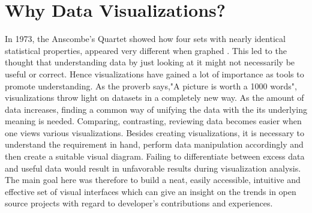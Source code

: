 \documentclass[double,12pt]{beavtex}
\begin{document}
\section{Why Data Visualizations?}
In 1973, the Anscombe's Quartet showed how four sets with nearly identical statistical properties, appeared very different when graphed \cite{wiki}. This led to the thought that understanding data by just looking at it might not necessarily be useful or correct. Hence visualizations have gained a lot of importance as tools to promote understanding. As the proverb says,"A picture is worth a 1000 words", visualizations throw light on datasets in a completely new way. As the amount of data increases, finding a common way of unifying the data with the its underlying meaning is needed. Comparing, contrasting, reviewing data becomes easier when one views various visualizations. Besides creating visualizations, it is necessary to understand the requirement in hand, perform data manipulation accordingly and then create a suitable visual diagram. Failing to differentiate between excess data and useful data would result in unfavorable results during visualization analysis.
The main goal here was therefore to build a neat, easily accessible, intuitive and effective set of visual interfaces which can give an insight on the trends in open source projects with regard to developer's contributions and experiences.
\end{document}
